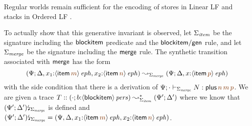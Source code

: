 Regular worlds remain sufficient for the encoding of stores in Linear
LF \cite{cervesato02linear} and stacks in Ordered LF
\cite{polakow01ordered}. 

To actually show that this generative invariant is observed, let
$\Sigma_{\it item}$ be the signature including the ${\sf blockitem}$
predicate and the ${\sf blockitem/gen}$ rule, and let $\Sigma_{\it
  merge}$ be the signature including the ${\sf merge}$ rule. 
The synthetic transition associated with ${\sf merge}$ 
has the form 
\[
(\Psi; \Delta, x_1{:}\iseph{\susp{{\sf item}\,\lf{m}}},
          x_2{:}\iseph{\susp{{\sf item}\,\lf{n}}}) 
\leadsto_{\Sigma_{\it merge}} 
 (\Psi; \Delta, x{:}\iseph{\susp{{\sf item}\,\lf{p}}})\]
with the side condition that there is a derivation
of $\Psi; \cdot \vdash_{\Sigma_{\it merge}} N : 
    {\sf plus}\,\lf{n}\,\lf{m}\,\lf{p}$. 
We are given a trace
$T :: (\cdot; b{:}{\langle {{\sf blockitem}} \rangle}\,{{\it pers}}) \leadsto^*_{\Sigma_{\it item}}
     (\Psi'; \Delta')$ where we know that
${(\Psi'; \Delta')}{\mbox{\lightning}}_{\Sigma_{\it merge}}$ is defined and
$\restrictsig{(\Psi'; \Delta')}{\Sigma_{\it merge}} = 
 (\Psi, \Delta, x_1{:}\iseph{\susp{{\sf item}\,\lf{m}}},
          x_2{:}\iseph{\susp{{\sf item}\,\lf{n}}})$. 






